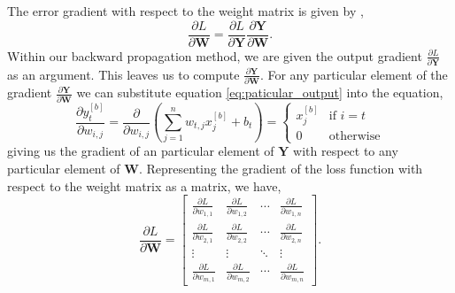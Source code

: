 \documentclass[twocolumn,pra,floatfix]{revtex4-2}
\begin{document}
                The error gradient with respect to the weight matrix is given by \cite{Bendersky2018},
                \begin{equation}
                    \frac{\partial L}{\partial \mathbf{W}} = \frac{\partial L}{\partial \mathbf{Y}} \frac{\partial \mathbf{Y}}{\partial \mathbf{W}}.
                \end{equation}
                Within our backward propagation method, we are given the output gradient $\frac{\partial L}{\partial \mathbf{Y}}$ as an argument. This leaves us to compute $\frac{\partial \mathbf{Y}}{\partial \mathbf{W}}$. For any particular element of the gradient $\frac{\partial \mathbf{Y}}{\partial \mathbf{W}}$ we can substitute equation \ref{eq:paticular_output} into the equation,
                \begin{equation}
                    \frac{\partial y^{[b]}_t}{\partial w_{i,j}} = \frac{\partial}{\partial w_{i,j}} \left( \sum_{j=1}^{n} w_{t,j} x_j^{[b]} + b_t \right) = 
                    \begin{cases}
                        x_j^{[b]} & \text{if } i = t \\
                        0 & \text{otherwise}
                    \end{cases}
                    \label{eq:dense_grad_particular}
                \end{equation}
                giving us the gradient of an particular element of $\mathbf{Y}$ with respect to any particular element of $\mathbf{W}$. Representing the gradient of the loss function with respect to the weight matrix as a matrix, we have,
                \begin{equation}
                    \frac{\partial L}{\partial \mathbf{W}} = 
                    \begin{bmatrix}
                        \frac{\partial L}{\partial w_{1,1}} & \frac{\partial L}{\partial w_{1,2}} & \cdots & \frac{\partial L}{\partial w_{1,n}} \\
                        \frac{\partial L}{\partial w_{2,1}} & \frac{\partial L}{\partial w_{2,2}} & \cdots & \frac{\partial L}{\partial w_{2,n}} \\
                        \vdots & \vdots & \ddots & \vdots \\
                        \frac{\partial L}{\partial w_{m,1}} & \frac{\partial L}{\partial w_{m,2}} & \cdots & \frac{\partial L}{\partial w_{m,n}}
                    \end{bmatrix}.
                    \label{eq:dense_grad_matrix}
                \end{equation}
\end{document}
